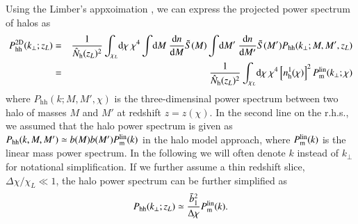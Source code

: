 \documentclass[onecolumn,notitlepage,showpacs,amsmath,amssymb,prd,floatfix]{revtex4-1}
\newcommand{\bk}{{\bf k}}
\newcommand{\dr}{\mathrm{d}}
\newcommand{\phh}{P_{\mathrm{hh}}}
\newcommand{\bh}{\mathrm{h}}
\newcommand{\bnh}{\frac{\dr n}{\dr M}}
\newcommand{\pml}{P^{\rm lin}_{\rm m}}
\begin{document}
Using the Limber's appxoimation \citep{Limber:54}, we can express the
projected power spectrum of halos as
%
\begin{eqnarray}
 \phh^{\rm 2D}(k_{\perp};z_L)&=&\frac{1}{\hat{N}_{\bh}(z_L)^2}
  \int_{\chi_L}\!\dr\chi~\chi^4
  \int\!\dr M~\frac{\dr n}{\dr M}\tilde{S}(M)
  \int\!\dr M'~\frac{\dr n}{\dr M'}\tilde{S}(M')
  \phh(k_\perp;M,M',z_L)\nonumber\\
 &=&\frac{1}{\hat{N}_{\bh}(z_L)^2}
  \int_{\chi_L}\!\dr\chi~\chi^4\left[n^1_{\bh}(\chi)\right]^2\pml(k_\perp;\chi)
\end{eqnarray}
%
where $\phh(k;M,M',\chi)$ is the three-dimensinal power spectrum between
two halo of masses $M$ and $M'$ at redshift $z=z(\chi)$. In the second
line on the r.h.s., we assumed that the halo power spectrum is given as
$\phh(k,M,M')\simeq
b(M)b(M')P^{\rm lin}_{\rm m}(k)$ in the halo model approach, where
$\pml(k)$ is the linear mass power spectrum. In the following we will
often denote $k$ instead of $k_\perp$ for notational simplification.
If we
further assume a thin redshift slice, $\Delta\chi/\chi_L\ll 1$, the halo
power spectrum can be further simplified as
%
\begin{eqnarray}
 \phh(k_\perp;z_L)\simeq \frac{\bar{b}_1^2}{\Delta \chi}P^{\rm lin}_{\rm m}(k).
\end{eqnarray}
%
\end{document}
